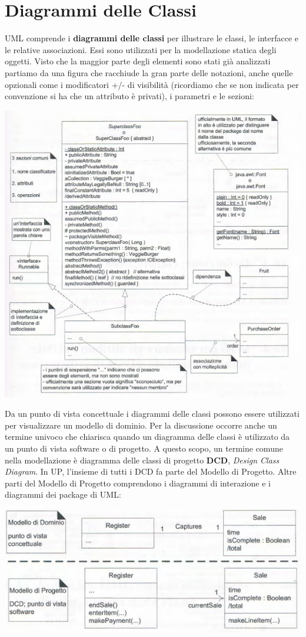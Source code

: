 \documentclass[a4paper,12pt, oneside]{book}
\begin{document}
\chapter{Diagrammi delle Classi}
UML comprende i \textbf{diagrammi delle classi} per illustrare le classi, le interfacce e le relative associazioni. Essi sono utilizzati per la modellazione statica degli oggetti. Visto che la maggior parte degli elementi sono stati già analizzati partiamo da una figura che racchiude la gran parte delle notazioni, anche quelle opzionali come i modificatori +/- di visibilità (ricordiamo che se non indicata per convenzione si ha che un attributo è privati), i parametri e le sezioni:
\begin{center}
	\includegraphics[scale=0.6]{img/clasd.png}
\end{center} 
Da un punto di vista concettuale i diagrammi delle classi possono essere utilizzati per visualizzare un modello di dominio. Per la discussione occorre anche un termine univoco che chiarisca quando un diagramma delle classi è utilizzato da un punto di vista software o di progetto. A questo scopo, un termine comune nella modellazione è diagramma delle classi di progetto \textbf{DCD}, \textit{Design Class Diagram}. In UP, l'insieme di tutti i DCD fa parte del Modello di Progetto. Altre parti del Modello di Progetto comprendono i diagrammi di interazione e i diagrammi dei package di UML:
\begin{center}
	\includegraphics[scale=0.57]{img/clasd2.png}
\end{center}
\end{document}
